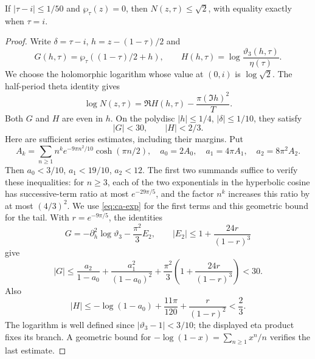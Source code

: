 \begin{statement}
If $|\tau-i|\le1/50$ and $\wp_\tau(z)=0$, then
$N(z,\tau)\le\sqrt2$, with equality exactly when $\tau=i$.
\end{statement}
\begin{proof}
Write $\delta=\tau-i$, $h=z-(1-\tau)/2$ and
\[
 G(h,\tau)=\wp_\tau((1-\tau)/2+h),\qquad
 H(h,\tau)=\log\frac{\vartheta_3(h,\tau)}{\eta(\tau)}.
\]
We choose the holomorphic logarithm whose value at $(0,i)$ is
$\log\sqrt2$. The half-period theta identity gives
\begin{equation}\label{eq:ca-H}
 \log N(z,\tau)=\Re H(h,\tau)-\frac{\pi(\Im h)^2}{T}.
\end{equation}
Both $G$ and $H$ are even in $h$. On the polydisc
$|h|\le1/4$, $|\delta|\le1/10$, they satisfy
\begin{equation}\label{eq:ca-GHbounds}
 |G|<30,\qquad |H|<2/3.
\end{equation}
Here are sufficient series estimates, including their margins.
Put
\[
 A_k=\sum_{n\ge1}n^k e^{-9\pi n^2/10}\cosh(\pi n/2),
 \quad a_0=2A_0,\quad a_1=4\pi A_1,\quad a_2=8\pi^2A_2.
\]
Then $a_0<3/10$, $a_1<19/10$, $a_2<12$.
The first two summands suffice to verify these inequalities: for
$n\ge3$, each of the two exponentials in the hyperbolic cosine
has successive-term ratio at most $e^{-29\pi/5}$, and the
factor $n^k$ increases this ratio by at most $(4/3)^2$.
We use \eqref{eq:ca-exp} for the first terms and this geometric
bound for the tail. With $r=e^{-9\pi/5}$, the identities
\[
 G=-\partial_h^2\log\vartheta_3-\frac{\pi^2}{3}E_2,
 \qquad
 |E_2|\le1+\frac{24r}{(1-r)^3}
\]
give
\[
 |G|\le\frac{a_2}{1-a_0}+\frac{a_1^2}{(1-a_0)^2}
       +\frac{\pi^2}{3}\left(1+\frac{24r}{(1-r)^3}\right)<30.
\]
Also
\[
 |H|\le-\log(1-a_0)+\frac{11\pi}{120}
                    +\frac{r}{(1-r)^2}<\frac23.
\]
The logarithm is well defined since $|\vartheta_3-1|<3/10$;
the displayed eta product fixes its branch. A geometric bound
for $-\log(1-x)=\sum_{n\ge1}x^n/n$ verifies the last estimate.


\end{proof}
